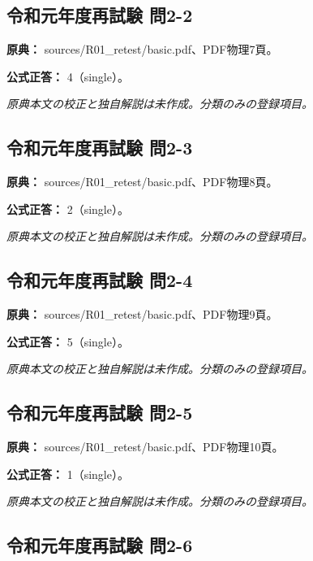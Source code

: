 \subsection{令和元年度再試験 問2-2}
\label{q:r01-ret-basic-2-2}

\noindent\textbf{原典：} sources/R01\_retest/basic.pdf、PDF物理7頁。

\textbf{公式正答：} 4（single）。

\par\textit{原典本文の校正と独自解説は未作成。分類のみの登録項目。}

\subsection{令和元年度再試験 問2-3}
\label{q:r01-ret-basic-2-3}

\noindent\textbf{原典：} sources/R01\_retest/basic.pdf、PDF物理8頁。

\textbf{公式正答：} 2（single）。

\par\textit{原典本文の校正と独自解説は未作成。分類のみの登録項目。}

\subsection{令和元年度再試験 問2-4}
\label{q:r01-ret-basic-2-4}

\noindent\textbf{原典：} sources/R01\_retest/basic.pdf、PDF物理9頁。

\textbf{公式正答：} 5（single）。

\par\textit{原典本文の校正と独自解説は未作成。分類のみの登録項目。}

\subsection{令和元年度再試験 問2-5}
\label{q:r01-ret-basic-2-5}

\noindent\textbf{原典：} sources/R01\_retest/basic.pdf、PDF物理10頁。

\textbf{公式正答：} 1（single）。

\par\textit{原典本文の校正と独自解説は未作成。分類のみの登録項目。}

\subsection{令和元年度再試験 問2-6}
\label{q:r01-ret-basic-2-6}

